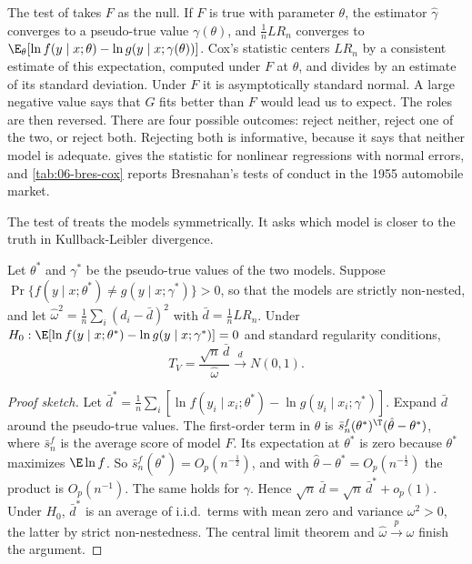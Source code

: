 The test of \citet{Cox1961, Cox1962} takes $F$ as the null. If $F$ is true with parameter $\theta$, the estimator
$\hat\gamma$ converges to a pseudo-true value $\gamma(\theta)$, and $\frac{1}{n}LR_n$ converges to
$\E_\theta[\ln f(y \mid x;\theta) - \ln g(y \mid x;\gamma(\theta))]$. Cox's statistic centers $LR_n$ by a consistent estimate of
this expectation, computed under $F$ at $\hat\theta$, and divides by an estimate of its standard deviation. Under $F$ it is
asymptotically standard normal. A large negative value says that $G$ fits better than $F$ would lead us to expect. The roles
are then reversed. There are four possible outcomes: reject neither, reject one of the two, or reject both. Rejecting both is
informative, because it says that neither model is adequate.  gives the statistic for nonlinear
regressions with normal errors, and \cref{tab:06-bres-cox} reports Bresnahan's tests of conduct in the 1955 automobile market.

The test of \citet{Vuong1989} treats the models symmetrically. It asks which model is closer to the truth in
Kullback-Leibler divergence.

\begin{proposition}\label{prop:A-vuong}
Let $\theta^*$ and $\gamma^*$ be the pseudo-true values of the two models. Suppose $\Pr\{f(y \mid x;\theta^*) \ne g(y \mid
x;\gamma^*)\} > 0$, so that the models are strictly non-nested, and let $\hat\omega^2 = \frac{1}{n}\sum_i(d_i - \bar d)^2$ with
$\bar d = \frac{1}{n}LR_n$. Under $H_0: \E[\ln f(y \mid x;\theta^*) - \ln g(y \mid x;\gamma^*)] = 0$ and standard regularity
conditions,
\begin{equation*}
  T_V = \frac{\sqrt{n}\,\bar d}{\hat\omega} \xrightarrow{d} N(0, 1).
\end{equation*}
\end{proposition}

\begin{proof}[Proof sketch]
Let $\bar d^* = \frac{1}{n}\sum_i[\ln f(y_i \mid x_i;\theta^*) - \ln g(y_i \mid x_i;\gamma^*)]$. Expand $\bar d$ around the
pseudo-true values. The first-order term in $\theta$ is $\bar s^f_n(\theta^*)^\T(\hat\theta - \theta^*)$, where $\bar s^f_n$ is the
average score of model $F$. Its expectation at $\theta^*$ is zero because $\theta^*$ maximizes $\E\ln f$. So $\bar s^f_n(\theta^*) =
O_p(n^{-\frac{1}{2}})$, and with $\hat\theta - \theta^* = O_p(n^{-\frac{1}{2}})$ the product is $O_p(n^{-1})$. The same holds for
$\gamma$. Hence $\sqrt{n}\,\bar d = \sqrt{n}\,\bar d^* + o_p(1)$. Under $H_0$, $\bar d^*$ is an average of i.i.d.\ terms with mean
zero and variance $\omega^2 > 0$, the latter by strict non-nestedness. The central limit theorem and $\hat\omega \xrightarrow{p}
\omega$ finish the argument.
\end{proof}

